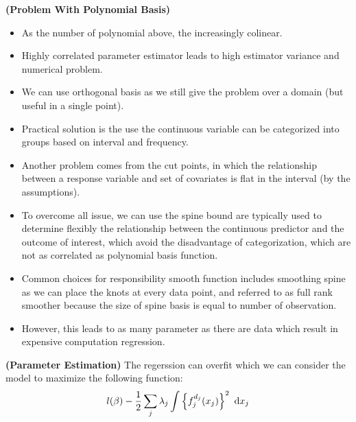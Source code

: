 \begin{remark}{\textbf{(Problem With Polynomial Basis)}}
    \begin{itemize}
        \item As the number of polynomial above, the increasingly colinear. 
        \item Highly correlated parameter estimator leads to high estimator variance and numerical problem. 
        \item We can use orthogonal basis as we still give the problem over a domain (but useful in a single point). 
        \item Practical solution is the use the continuous variable can be categorized into groups based on interval and frequency. 
        \item Another problem comes from the cut points, in which the relationship between a response variable and set of covariates is flat in the interval (by the assumptions).
        \item To overcome all issue, we can use the spine bound are typically used to determine flexibly the relationship between the continuous predictor and the outcome of interest, which avoid the disadvantage of categorization, which are not as correlated as polynomial basis function. 
        \item Common choices for responsibility smooth function includes smoothing spine as we can place the knots at every data point, and referred to as full rank smoother because the size of spine basis is equal to number of observation. 
        \item However, this leads to as many parameter as there are data which result in expensive computation regression.
    \end{itemize}
\end{remark}

\begin{remark}{\textbf{(Parameter Estimation)}}
    The regerssion can overfit which we can consider the model to maximize the following function:
    \begin{equation*}
        l(\beta) - \frac{1}{2}\sum_j\lambda_j\int \left\{ f^{d_j}_j(x_j) \right\}^2 \ \mathrm{d} x_j
    \end{equation*}
\end{remark}

